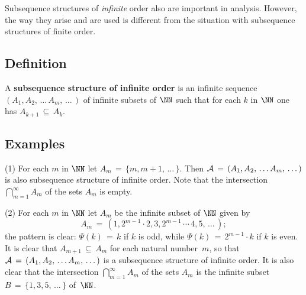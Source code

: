 \VV

        Subsequence structures of {\em infinite} order also are important in analysis.
    However, the way they arise and are used is different from the situation with subsequence structures of finite order.

\V

        \subsection{\small{{\bf Definition}}}
        \label{DefA40.45}

\V

         A {\bf subsequence structure of infinite order} is an infinite sequence $(A_{1}, A_{2},\,{\ldots}\,A_{m},\,{\ldots}\,)$
    of infinite subsets of ${\NN}$ such that for each $k$ in ${\NN}$ one has $A_{k+1} \,{\subseteq}\, A_{k}$.

\VV

        \subsection{\small{{\bf Examples}}}
        \label{ExampA40.47}

\V

\hspace*{\parindent}(1) For each $m$ in ${\NN}$ let $A_{m} \,=\, \{m, m+1, \,{\ldots}\,\}$. Then ${\cal A} \,=\, (A_{1}, A_{2},\,{\ldots}\,A_{m},\,{\ldots}\,)$
    is also subsequence structure of infinite order. Note that the intersection $\bigcap_{m=1}^{{\infty}} A_{m}$ of the sets $A_{m}$ is empty.

\V

        (2) For each $m$ in ${\NN}$ let $A_{m}$ be the infinite subset of ${\NN}$ given by
        \begin{displaymath}
        A_{m} \,=\, (1, 2^{m-1}{\cdot}2, 3, 2^{m-1} \,{\cdots}\, 4, 5, \,{\ldots}\,);
        \end{displaymath}
    the pattern is clear: ${\Psi}(k) \,=\, k$ if $k$ is odd, while ${\Psi}(k) \,=\, 2^{m-1}{\cdot}k$ if $k$ is even.
    It is clear that $A_{m+1} \,{\subseteq}\, A_{m}$ for each natural number~$m$,
    so that ${\cal A} \,=\, (A_{1}, A_{2},\,{\ldots}\,A_{m},\,{\ldots}\,)$ is a subsequence structure of infinite order.
    It is also clear that the intersection $\bigcap_{m=1}^{{\infty}} A_{m}$ of the sets
    $A_{m}$ is the infinite subset $B \,=\, \{1, 3, 5, \,{\ldots}\,\}$ of~${\NN}$.

